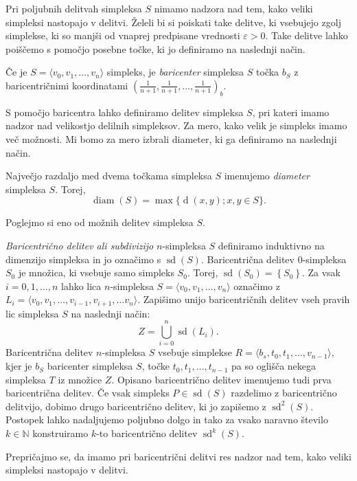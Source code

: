 \documentclass[mat1]{fmfdelo}
\newcommand{\N}{\mathbb N}
\DeclareMathOperator{\diam}{diam}
\DeclareMathOperator{\sd}{sd}
\DeclareMathOperator{\dist}{d}
\newcommand{\0}{\underline{0}}
\begin{document}
Pri poljubnih delitvah simpleksa $S$ nimamo nadzora nad tem, kako veliki simpleksi nastopajo v delitvi. Želeli bi si poiskati take delitve, ki vsebujejo zgolj simplekse, ki so manjši od vnaprej predpisane vrednosti $\varepsilon > 0$. Take delitve lahko poiščemo s pomočjo posebne točke, ki jo definiramo na naslednji način.
\begin{definicija}
Če je $S = \langle v_0, v_1, \dots, v_n \rangle$ simpleks, je \emph{baricenter} simpleksa $S$ točka $b_S$ z baricentričnimi koordinatami $\left( \frac{1}{n+1}, \frac{1}{n+1}, \dots, \frac{1}{n+1} \right )_b$.
\end{definicija}
S pomočjo baricentra lahko definiramo delitev simpleksa $S$, pri kateri imamo nadzor nad velikostjo delilnih simpleksov. Za mero, kako velik je simpleks imamo več možnosti. Mi bomo za mero izbrali diameter, ki ga definiramo na naslednji način.
\begin{definicija}
Največjo razdaljo med dvema točkama simpleksa $S$ imenujemo \emph{diameter} simpleksa $S$. Torej,
$$\diam(S) = \max \{ \dist(x, y); x, y \in S\}.$$
\end{definicija}
Poglejmo si eno od možnih delitev simpleksa $S$.
\begin{definicija}
\emph{Baricentrično delitev ali subdivizijo} $n$-simpleksa $S$ definiramo induktivno na dimenzijo simpleksa in jo označimo s $\sd(S)$. Baricentrična delitev $0$-simpleksa $S_0$ je množica, ki vsebuje samo simpleks $S_0$. Torej, $\sd(S_0) = \left \{ S_0 \right \}$. Za vsak $i = 0, 1, \dots, n$ lahko lica $n$-simpleksa $S = \langle v_0, v_1, \dots, v_n \rangle$ označimo z $L_i = \langle v_0, v_1, \dots, v_{i-1}, v_{i+1}, \dots v_n \rangle$. Zapišimo unijo baricentričnih delitev vseh pravih lic simpleksa $S$ na naslednji način:
$$Z = \bigcup_{i = 0}^n \sd(L_i).$$
Baricentrična delitev $n$-simpleksa $S$ vsebuje simplekse $R = \langle b_s , t_0, t_1, \dots, v_{n-1} \rangle$, kjer je $b_S$ baricenter simpleksa $S$, točke $t_0, t_1, \dots, t_{n-1}$ pa so oglišča nekega simpleksa $T$ iz množice $Z$. Opisano baricentrično delitev imenujemo tudi prva baricentrična delitev. Če vsak simpleks $P \in \sd(S)$ razdelimo z baricentrično delitvijo, dobimo drugo baricentrično delitev, ki jo zapišemo z $\sd^2(S)$. Postopek lahko nadaljujemo poljubno dolgo in tako za vsako naravno število $k \in \N$ konstruiramo $k$-to baricentrično delitev $\sd^k(S)$.
\end{definicija}
Prepričajmo se, da imamo pri baricentrični delitvi res nadzor nad tem, kako veliki simpleksi nastopajo v delitvi.
\end{document}
